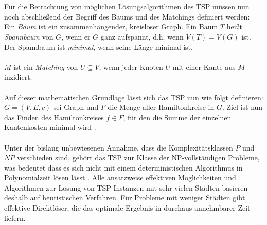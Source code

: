 \documentclass[doktyp=barbeit, sprache=german]{TUBAFarbeiten}
\begin{document}
\\\\Für die Betrachtung von möglichen Lösungsalgorithmen des TSP müssen nun noch abschließend der Begriff des Baums und des Matchings definiert werden:
\\Ein \textit{Baum} ist ein zusammenhängender, kreisloser Graph. Ein Baum $T$ heißt \textit{Spannbaum} von $G$, wenn er $G$ ganz aufspannt, d.h. wenn $V(T) = V(G)$ ist. Der Spannbaum ist \textit{minimal}, wenn seine Länge minimal ist.
\\\\$M$ ist ein \textit{Matching} von $U \subseteq V$, wenn jeder Knoten $U$ mit einer Kante aus $M$ inzidiert.
\\\\Auf dieser mathematischen Grundlage lässt sich das TSP nun wie folgt definieren: 
\\$G = (V,E,c)$ sei Graph und $F$ die Menge aller Hamiltonkreise in $G$. Ziel ist nun das Finden des Hamiltonkreises $f \in F$, für den die Summe der einzelnen Kantenkosten minimal wird \cite{TSPVariations}.
\\\\Unter der bislang unbewiesenen Annahme, dass die Komplexitätsklassen $P$ und $NP$ verschieden sind, gehört das TSP zur Klasse der NP-vollständigen Probleme, was bedeutet dass es sich nicht mit einem deterministischen Algorithmus in Polynomialzeit lösen lässt \cite{Applegate2007}.  Alle ansatzweise effektiven Möglichkeiten und Algorithmen zur Lösung von TSP-Instanzen mit sehr vielen Städten basieren deshalb auf heuristischen Verfahren. Für Probleme mit weniger Städten gibt effektive Direktlöser, die das optimale Ergebnis in durchaus annehmbarer Zeit liefern.
\end{document}
